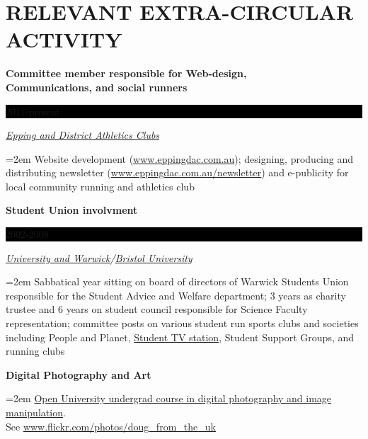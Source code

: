 \documentclass[paper=a4,fontsize=11pt]{scrartcl}	 			%
\newcommand{\sepspace}{\vspace*{1em}}			%
\newcommand{\NewPart}[1]{\section*{\uppercase{#1}}}
\newcommand{\EducationEntry}[4]{
		\noindent \textbf{#1} \hfill 					%
		\colorbox{Black}{%
			\parbox{6.5em}{%
			\hfill\color{White}#2}} \par				%
		\noindent \textit{#3} \par					%
		\noindent\hangindent=2em\hangafter=0 \small #4 	%
		\normalsize \par}
\newcommand{\BibEntry}[2]{
		\noindent \textbf{#1} \hfill \par					%
		\noindent\hangindent=2em\hangafter=0 \small #2 	%
		\normalsize \par}
\begin{document}
\NewPart{Relevant Extra-Circular activity}{}
\EducationEntry{Committee member responsible for Web-design,\\ Communications, and social runners}{2011-present}{\href{http://www.eppingdac.com.au/}{Epping and District Athletics Clubs}}
  {Website development (\href{http://www.eppingdac.com.au/}{www.eppingdac.com.au}); designing, producing and distributing newsletter  (\href{http://www.eppingdac.com.au/newsletter}{www.eppingdac.com.au/newsletter}) and e-publicity for local community running and athletics club}
\sepspace  

\EducationEntry{Student Union involvment}{2002-2008}{\href{http://www.warwicksu.com/}{University and Warwick}/\href{http://www.ubu.org.uk/}{Bristol University}}
  {Sabbatical year sitting on board of directors of Warwick Students Union responsible for the Student Advice and Welfare department; 3 years as charity trustee and 6 years on student council responsible for Science Faculty representation; committee posts on various student run sports clubs and societies including People and Planet, \href{http://tv.warwick.ac.uk/}{Student TV station}, Student Support Groups, and running clubs}
\sepspace  

\BibEntry{Digital Photography and Art}{\href{http://www3.open.ac.uk/study/undergraduate/course/t189.htm}{Open University undergrad course in digital photography and image manipulation}. \\ See \href{http://www.flickr.com/photos/doug\_from\_the\_uk/}{www.flickr.com/photos/doug\_from\_the\_uk}}




%
%
\end{document}
